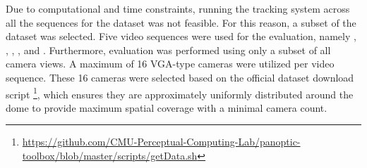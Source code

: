 Due to computational and time constraints, running the tracking system across all the sequences for the dataset was not feasible. For this reason, a subset of the dataset was selected. Five video sequences were used for the evaluation, namely , , , , and . Furthermore, evaluation was performed using only a subset of all camera views. A maximum of 16 VGA-type cameras were utilized per video sequence. These 16 cameras were selected based on the official dataset download script \footnote{\url{https://github.com/CMU-Perceptual-Computing-Lab/panoptic-toolbox/blob/master/scripts/getData.sh}}, which ensures they are approximately uniformly distributed around the dome to provide maximum spatial coverage with a minimal camera count.
